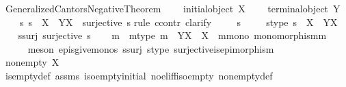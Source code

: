 \begin{isabellebody}
{\isafoldproof}%
%
\isadelimproof
\isanewline
%
\endisadelimproof
\isanewline
{}\isamarkupfalse%
\ Generalized{\isacharunderscore}{\kern0pt}Cantors{\isacharunderscore}{\kern0pt}Negative{\isacharunderscore}{\kern0pt}Theorem{\isacharcolon}{\kern0pt}\isanewline
\ \ \ {\isachardoublequoteopen}{\isasymnot}\ initial{\isacharunderscore}{\kern0pt}object\ X{\isachardoublequoteclose}\isanewline
\ \ \ {\isachardoublequoteopen}{\isasymnot}\ terminal{\isacharunderscore}{\kern0pt}object\ Y{\isachardoublequoteclose}\isanewline
\ \ \ {\isachardoublequoteopen}{\isasymnexists}\ s{\isachardot}{\kern0pt}\ s\ {\isacharcolon}{\kern0pt}\ X\ {\isasymrightarrow}\ Y\isactrlbsup X\isactrlesup \ {\isasymand}\ surjective\ s{\isachardoublequoteclose}\isanewline
%
\isadelimproof
%
\endisadelimproof
%
\isatagproof
{}\isamarkupfalse%
{\isacharparenleft}{\kern0pt}rule\ ccontr{\isacharcomma}{\kern0pt}\ clarify{\isacharparenright}{\kern0pt}\ \isanewline
\ \ \isamarkupfalse%
\ s\ \isanewline
\ \ \isamarkupfalse%
\ s{\isacharunderscore}{\kern0pt}type{\isacharcolon}{\kern0pt}\ {\isachardoublequoteopen}s\ {\isacharcolon}{\kern0pt}\ X\ {\isasymrightarrow}\ Y\isactrlbsup X\isactrlesup {\isachardoublequoteclose}\isanewline
\ \ \isamarkupfalse%
\ s{\isacharunderscore}{\kern0pt}surj{\isacharcolon}{\kern0pt}\ {\isachardoublequoteopen}surjective\ s{\isachardoublequoteclose}\isanewline
\ \ \isamarkupfalse%
\ m\ \ m{\isacharunderscore}{\kern0pt}type{\isacharcolon}{\kern0pt}\ {\isachardoublequoteopen}m\ {\isacharcolon}{\kern0pt}\ Y\isactrlbsup X\isactrlesup \ {\isasymrightarrow}\ X{\isachardoublequoteclose}\ \ m{\isacharunderscore}{\kern0pt}mono{\isacharcolon}{\kern0pt}\ {\isachardoublequoteopen}monomorphism{\isacharparenleft}{\kern0pt}m{\isacharparenright}{\kern0pt}{\isachardoublequoteclose}\isanewline
\ \ \ \ \isamarkupfalse%
\ {\isacharparenleft}{\kern0pt}meson\ epis{\isacharunderscore}{\kern0pt}give{\isacharunderscore}{\kern0pt}monos\ s{\isacharunderscore}{\kern0pt}surj\ s{\isacharunderscore}{\kern0pt}type\ surjective{\isacharunderscore}{\kern0pt}is{\isacharunderscore}{\kern0pt}epimorphism{\isacharparenright}{\kern0pt}\isanewline
\ \ \isamarkupfalse%
\ {\isachardoublequoteopen}nonempty\ X{\isachardoublequoteclose}\isanewline
\ \ \ \ \isamarkupfalse%
\ is{\isacharunderscore}{\kern0pt}empty{\isacharunderscore}{\kern0pt}def\ assms{\isacharparenleft}{\kern0pt}{}{\isacharparenright}{\kern0pt}\ iso{\isacharunderscore}{\kern0pt}empty{\isacharunderscore}{\kern0pt}initial\ no{\isacharunderscore}{\kern0pt}el{\isacharunderscore}{\kern0pt}iff{\isacharunderscore}{\kern0pt}iso{\isacharunderscore}{\kern0pt}empty\ nonempty{\isacharunderscore}{\kern0pt}def\ \isamarkupfalse%

\end{isabellebody}
